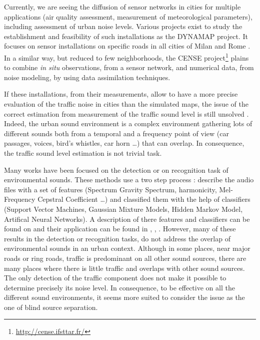 \documentclass[twocolumn,a4paper,10pt]{article}
\begin{document}
Currently, we are seeing the diffusion of sensor networks in cities for multiple applications (air quality assessment, measurement of meteorological parameters), including assessment of urban noise levels. Various projects exist to study the establishment and feasibility of such installations as the DYNAMAP \cite{dynamap_2016} project. It focuses on sensor installations on specific roads in all cities of Milan and Rome \cite{bellucci_life_2017}. In a similar way, but reduced to few neighborhoods, the CENSE project\footnote{\url{http://cense.ifsttar.fr/}} \cite{} plains to combine \textit{in situ} observations, from a sensor network, and numerical data, from noise modeling, by using data assimilation techniques.

If these installations, from their measurements, allow to have a more precise evaluation of the traffic noise in cities than the simulated maps, the issue of the correct estimation from measurement of the traffic sound level is still unsolved \cite{Mioduszewski}. Indeed, the urban sound environment is a complex environment gathering lots of different sounds both from a temporal and a frequency point of view (car passages, voices, bird's whistles, car horn \dots) that can overlap. In consequence, the traffic sound level estimation is not trivial task. 

Many works have been focused on the detection  \cite{heittola_sound_2011} or on recognition \cite{defreville_automatic_2006} task of environmental sounds. These methods use a two step process : describe the audio files with a set of features (Spectrum Gravity Spectrum, harmonicity, Mel-Frequency Cepstral Coefficient \dots) and classified them with the help of classifiers (Support Vector Machines, Gaussian Mixture Models, Hidden Markov Model, Artifical Neural Networks). A description of there features and classifiers can be found on \cite{cowling_comparison_2003} and their application can be found in \cite{shen_environmental_2012}, \cite{beritelli_pattern_2008}, \cite{couvreur_automatic_2004}.
However, many of these results in the detection or recognition tasks, do not address the overlap of environmental sounds in an urban context. Although in some places, near major roads or ring roads, traffic is predominant on all other sound sources, there are many places where there is little traffic and overlaps with other sound sources. The only detection of the traffic component does not make it possible to determine precisely its noise level. In consequence, to be effective on all the different sound environments, it seems more suited to consider the issue as the one of blind source separation.
\end{document}
